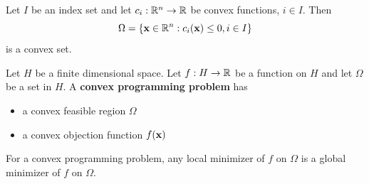 \begin{proposition}
    Let \(I\) be an index set and let \(c_i: \mathbb{R}^n \to \mathbb{R}\) be convex functions, \(i \in I\). Then
    \[\Omega = \{\mathbf{x} \in \mathbb{R}^n: c_i(\mathbf{x}) \leq 0, i \in I\}\]
    is a convex set.
\end{proposition}



\begin{definition}
    Let \(H\) be a finite dimensional space. Let \(f: H \to \mathbb{R}\) be a function on \(H\) and let \(\Omega\) be a set in \(H\). A \textbf{convex programming problem} has
    \begin{itemize}
        \item a convex feasible region \(\Omega\)
        \item a convex objection function \(f(\mathbf{x})\)
    \end{itemize}
\end{definition}

\begin{proposition}
    For a convex programming problem, any local minimizer of \(f\) on \(\Omega\) is a global minimizer of \(f\) on \(\Omega\).
\end{proposition}